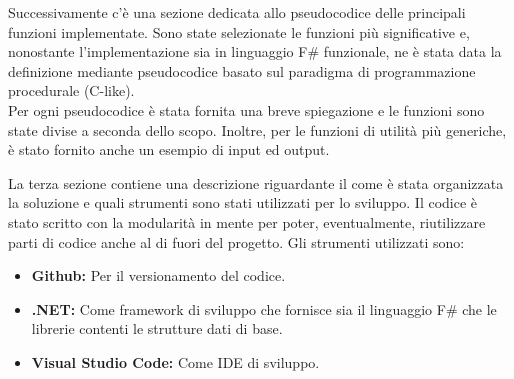 \documentclass{oist}
\begin{document}
Successivamente c'è una sezione dedicata allo pseudocodice delle principali funzioni implementate. Sono state selezionate le funzioni più significative e, nonostante l'implementazione sia in linguaggio F\# funzionale, ne è stata data la definizione mediante pseudocodice basato sul paradigma di programmazione procedurale (C-like). \\
Per ogni pseudocodice è stata fornita una breve spiegazione e le funzioni sono state divise a seconda dello scopo. Inoltre, per le funzioni di utilità più generiche, è stato fornito anche un esempio di input ed output.

La terza sezione contiene una descrizione riguardante il come è stata organizzata la soluzione e quali strumenti sono stati utilizzati per lo sviluppo. Il codice è stato scritto con la modularità in mente per poter, eventualmente, riutilizzare parti di codice anche al di fuori del progetto. Gli strumenti utilizzati sono:
\begin{itemize}
    \item \textbf{Github:} Per il versionamento del codice. 
    \item \textbf{.NET:} Come framework di sviluppo che fornisce sia il linguaggio F\# che le librerie contenti le strutture dati di base.
    \item \textbf{Visual Studio Code:} Come IDE di sviluppo. 
\end{itemize}
\end{document}
